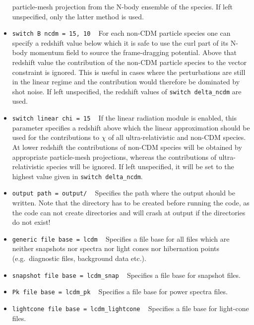 \documentclass[a4paper,10pt]{article}
\begin{document}
\begin{itemize}
 particle-mesh projection from the N-body ensemble of the species. If left unspecified, only the latter method is used.
 \item[] \hspace{-25pt}\texttt{switch B ncdm = 15, 10} ~ For each non-CDM particle species one can specify a redshift value below which
 it is safe to use the curl part of its N-body momentum field to source the frame-dragging potential. Above that redshift value
 the contribution of the non-CDM particle species to the vector constraint is ignored. This is useful in cases where the perturbations
 are still in the linear regime and the contribution would therefore be dominated by shot noise. If left unspecified, the redshift values
 of \texttt{switch delta\_ncdm} are used.
 \item[] \hspace{-25pt}\texttt{switch linear chi = 15} ~ If the linear radiation module is enabled, this parameter specifies a
 redshift above which the linear approximation should be used for the contributions to $\mathsf{\chi}$ of all ultra-relativistic
 and non-CDM species. At lower redshift the contributions of non-CDM species will be obtained by appropriate particle-mesh projections,
 whereas the contributions of ultra-relativistic species will be ignored. If left unspecified, it will be set to the highest value given
 in \texttt{switch delta\_ncdm}.
 \item[] \hspace{-25pt}\texttt{output path = output/} ~ Specifies the path where the output should be written. Note that the directory has
 to be created before running the code, as the code can not create directories and will crash at output if the directories do not exist!
 \item[] \hspace{-25pt}\texttt{generic file base = lcdm} ~ Specifies a file base for all files which are neither snapshots nor spectra
 nor light cones nor hibernation points (e.g.\ diagnostic files, background data etc.).
 \item[] \hspace{-25pt}\texttt{snapshot file base = lcdm\_snap} ~ Specifies a file base for snapshot files.
 \item[] \hspace{-25pt}\texttt{Pk file base = lcdm\_pk} ~ Specifies a file base for power spectra files.
 \item[] \hspace{-25pt}\texttt{lightcone file base = lcdm\_lightcone} ~ Specifies a file base for light-cone files.

\end{itemize}
\end{document}
